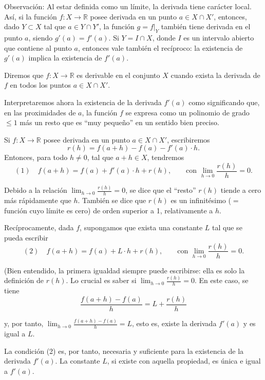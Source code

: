 \documentclass[12pt,oneside]{book}
\begin{document}
Observación: Al estar definida como un límite, la derivada tiene carácter local. Así, si la función \( f: X \to \mathbb{R} \) posee derivada en un punto \( a \in X \cap X' \), entonces, dado \( Y \subset X \) tal que \( a \in Y \cap Y' \), la función \( g = f|_Y \) también tiene derivada en el punto \( a \), siendo \( g'(a) = f'(a) \). Si \( Y = I \cap X \), donde \( I \) es un intervalo abierto que contiene al punto \( a \), entonces vale también el recíproco: la existencia de \( g'(a) \) implica la existencia de \( f'(a) \).

Diremos que \( f: X \to \mathbb{R} \) es derivable en el conjunto \( X \) cuando exista la derivada de \( f \) en todos los puntos \( a \in X \cap X' \).

Interpretaremos ahora la existencia de la derivada \( f'(a) \) como significando que, en las proximidades de \( a \), la función \( f \) se expresa como un polinomio de grado \( \leq 1 \) más un resto que es “muy pequeño” en un sentido bien preciso.

Si \( f: X \to \mathbb{R} \) posee derivada en un punto \( a \in X \cap X' \), escribiremos
\[
r(h) = f(a + h) - f(a) - f'(a) \cdot h.
\]
Entonces, para todo \( h \neq 0 \), tal que \( a + h \in X \), tendremos
\[
(1) \quad f(a + h) = f(a) + f'(a) \cdot h + r(h), \qquad \text{con } \lim_{h \to 0} \frac{r(h)}{h} = 0.
\]

Debido a la relación \( \lim_{h \to 0} \frac{r(h)}{h} = 0 \), se dice que el “resto” \( r(h) \) tiende a cero más rápidamente que \( h \). También se dice que \( r(h) \) es un infinitésimo (\( = \) función cuyo límite es cero) de orden superior a 1, relativamente a \( h \).

Recíprocamente, dada \( f \), supongamos que exista una constante \( L \) tal que se pueda escribir
\[
(2) \quad f(a + h) = f(a) + L \cdot h + r(h), \qquad \text{con } \lim_{h \to 0} \frac{r(h)}{h} = 0.
\]

(Bien entendido, la primera igualdad siempre puede escribirse: ella es solo la definición de \( r(h) \). Lo crucial es saber si \( \lim_{h \to 0} \frac{r(h)}{h} = 0 \). En este caso, se tiene
\[
\frac{f(a+h) - f(a)}{h} = L + \frac{r(h)}{h}
\]

y, por tanto, \( \lim_{h \to 0} \frac{f(a+h) - f(a)}{h} = L \), esto es, existe la derivada \( f'(a) \) y es igual a \( L \).

La condición (2) es, por tanto, necesaria y suficiente para la existencia de la derivada \( f'(a) \). La constante \( L \), si existe con aquella propiedad, es única e igual a \( f'(a) \).
\end{document}
